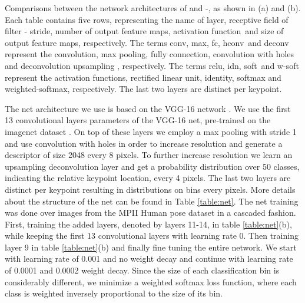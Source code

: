 \documentclass{article}
\begin{document}
\begin{table}[ht]
		\caption{Comparisons between the network architectures of  and -, as shown in (a) and (b). Each table contains five rows, representing the \textquotesingle name of layer\textquotesingle, \textquotesingle receptive field of filter \-- stride\textquotesingle, \textquotesingle number of output feature maps\textquotesingle , \textquotesingle activation function\textquotesingle \, and \textquotesingle size of output feature maps\textquotesingle , respectively. The terms \textquotesingle conv\textquotesingle, \textquotesingle max\textquotesingle, \textquotesingle fc\textquotesingle, \textquotesingle hconv\textquotesingle \, and \textquotesingle deconv\textquotesingle \,  represent the convolution, max pooling, fully connection, convolution with holes \cite{chen2014semantic} and deconvolution upsampling \cite{Long15}, respectively. The terms \textquotesingle relu\textquotesingle, \textquotesingle idn\textquotesingle, \textquotesingle soft\textquotesingle \, and \textquotesingle w-soft\textquotesingle \, represent the activation functions, rectified linear unit, identity, softmax and weighted-softmax, respectively. The last two layers are distinct per keypoint.} 
		\label{table:net}
	\end{table} 
	
	The net architecture we use is based on the VGG-16 network \cite{Simonyan15}. We use the first 13 convolutional layers parameters of the VGG-16 net, pre-trained on the imagenet dataset \cite{russakovsky15}. On top of these layers we employ a max pooling with stride 1 and use convolution with holes \cite{chen2014semantic} in order to increase resolution and generate a descriptor of size 2048 every 8 pixels. To further increase resolution we learn an upsampling deconvolution layer  \cite{Long15} and get a probability distribution over 50 classes, indicating the relative keypoint location, every 4 pixels. The last two layers are distinct per keypoint resulting in  distributions on  bins every  pixels. More details about the structure of the net can be found in Table \ref{table:net}. The net training was done over images from the MPII Human pose dataset \cite{andriluka14} in a cascaded fashion. First, training the added layers, denoted by layers 11-14, in table \ref{table:net}(b), while keeping the first 13  convolutional layers with learning rate 0. Then training layer 9 in table \ref{table:net}(b) and finally fine tuning the entire network. We start with learning rate of 0.001 and no weight decay and continue with learning rate of 0.0001 and 0.0002 weight decay. Since the size of  each classification bin is considerably different, we minimize a weighted softmax loss function, where each class is weighted inversely proportional to the size of its bin.   \\
	
\end{document}
